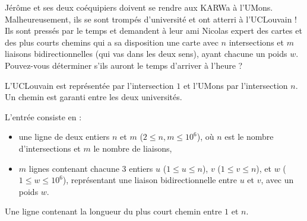 \problemname{\problemyamlname}



Jérôme et ses deux coéquipiers doivent se rendre aux KARWa à l'UMons.
Malheureusement, ils se sont trompés d'université et ont atterri à l'UCLouvain !
Ils sont pressés par le temps et demandent à leur ami Nicolas expert des cartes et des plus courts chemins qui a sa disposition une carte avec $n$ intersections et $m$ liaisons bidirectionnelles (qui vas dans les deux sens), ayant chacune un poids $w$.
Pouvez-vous déterminer s'ils auront le temps d'arriver à l'heure ?

L'UCLouvain est représentée par l'intersection $1$ et l'UMons par l'intersection $n$.
Un chemin est garanti entre les deux universités.

\begin{Input}
	L'entrée consiste en :
	\begin{itemize}
		\item une ligne de deux entiers $n$ et $m$ ($2 \le n, m \le 10^6$), où $n$ est le nombre d'intersections et $m$ le nombre de liaisons,
		\item $m$ lignes contenant chacune 3 entiers $u$ ($1 \le u \le n$), $v$ ($1 \le v \le n$), et $w$ ($1 \le w \le 10^6$), représentant une liaison bidirectionnelle entre $u$ et $v$, avec un poids $w$.
	\end{itemize}
\end{Input}

\begin{Output}
	Une ligne contenant la longueur du plus court chemin entre $1$ et $n$.
\end{Output}
